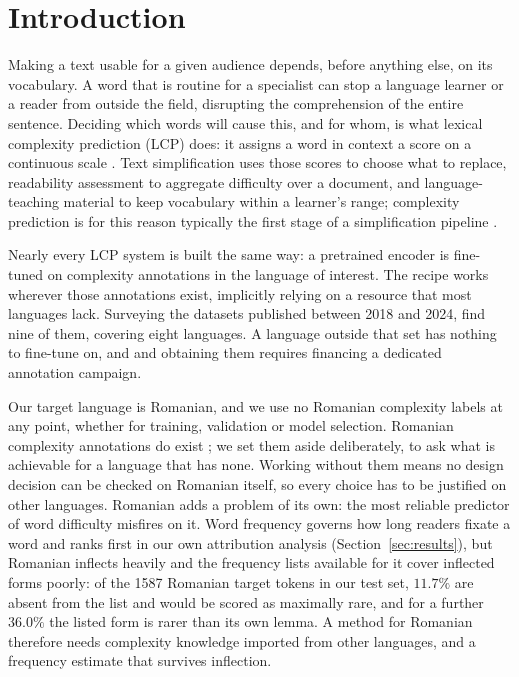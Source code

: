 \section{Introduction}
\label{section:intro}

Making a text usable for a given audience depends, before anything else,
on its vocabulary. A word that is routine for a specialist can stop a
language learner or a reader from outside the field, disrupting the comprehension of the entire sentence. Deciding which
words will cause this, and for whom, is what lexical complexity
prediction (LCP) does: it assigns a word in context a score on a
continuous scale \citep{shardlow-etal-2021-semeval}. Text simplification
uses those scores to choose what to replace, readability assessment to
aggregate difficulty over a document, and language-teaching material to
keep vocabulary within a learner's range; complexity prediction is for
this reason typically the first stage of a simplification pipeline
\citep{qiu-etal-2024-complex}.

Nearly every LCP system is built the same way: a pretrained encoder is
fine-tuned on complexity annotations in the language of interest. The
recipe works wherever those annotations exist, implicitly relying on a resource that most languages lack. Surveying the datasets published
between 2018 and 2024, \citet{shardlow-etal-2024-multilingual} find nine
of them, covering eight languages. A language outside that set has
nothing to fine-tune on, and and obtaining them requires financing a dedicated annotation campaign.

Our target language is Romanian, and we use no Romanian complexity
labels at any point, whether for training, validation or model
selection. Romanian complexity annotations do exist
\citep{anghel-etal-2025-rals}; we set them aside deliberately, to ask
what is achievable for a language that has none. Working without them
means no design decision can be checked
on Romanian itself, so every choice has to be justified on other
languages. Romanian adds a problem of its own: the most reliable
predictor of word difficulty misfires on it. Word frequency governs how
long readers fixate a word \citep{rayner1998eye} and ranks first in our
own attribution analysis (Section~\ref{sec:results}), but Romanian
inflects heavily and the frequency lists available for it cover
inflected forms poorly: of the 1587 Romanian target tokens in our test
set, $11.7\%$ are absent from the list and would be scored as maximally
rare, and for a further $36.0\%$ the listed form is rarer than its own
lemma. A method for Romanian therefore needs complexity knowledge
imported from other languages, and a frequency estimate that survives
inflection.

